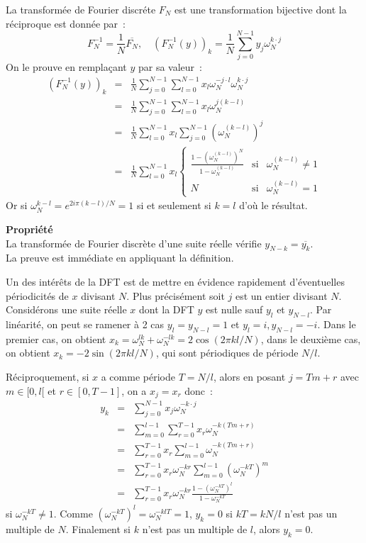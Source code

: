 \documentclass[a4paper,11pt]{article}
\begin{document}
La transform\'ee de Fourier discr\'ete  $F_N$ est une transformation 
bijective dont la réciproque est donnée par~:
\[ F_N^{-1}=\frac{1}{N} \overline{F_N}, \quad
{(F_N^{-1}(y))}_k=\frac{1}{N}\sum_{j=0}^{N-1}y_j\omega_N^{k\cdot j}
\]
On le prouve en remplaçant $y$ par sa valeur~:
\begin{eqnarray*}
{(F_N^{-1}(y))}_k &=&
\frac{1}{N}\sum_{j=0}^{N-1} \sum_{l=0}^{N-1} x_l \omega_N^{-j\cdot l}
\omega_N^{k\cdot j} \\
&=&
\frac{1}{N}\sum_{j=0}^{N-1} \sum_{l=0}^{N-1} x_l \omega_N^{j (k-l)} \\
&=& 
\frac{1}{N} \sum_{l=0}^{N-1} x_l \sum_{j=0}^{N-1} (\omega_N^{(k-l)})^j \\
&=&
\frac{1}{N} \sum_{l=0}^{N-1} x_l 
\left\{ \begin{array}{lcl}
\frac{1-(\omega_N^{(k-l)})^N}{1-\omega_N^{(k-l)}} & \mbox{si} &
\omega_N^{(k-l)}\neq 1 \\
N & \mbox{si} & \omega_N^{(k-l)} = 1 
\end{array} \right.
\end{eqnarray*}
Or si $\omega_N^{k-l}=e^{2i\pi(k-l)/N}=1$ si et seulement si $k=l$
d'où le résultat.

{\bf Propriété}\\
La transformée de Fourier discrète d'une suite réelle vérifie
$y_{N-k}=\overline{y_k}$.\\
La preuve est immédiate en appliquant la définition.

Un des intérêts de la DFT est de mettre en évidence rapidement
d'éventuelles périodicités de $x$ divisant $N$. Plus précisément
soit $j$ est un entier divisant $N$. Considérons une suite réelle $x$ dont
la DFT $y$ est nulle sauf $y_l$ et $y_{N-l}$. Par linéarité, on
peut se ramener à 2 cas $y_l=y_{N-l}=1$ et $y_l=i, y_{N-l}=-i$. Dans
le premier cas, on obtient $x_k=\omega_N^{lk}+\omega_N^{-lk}=2\cos(2\pi kl/N)$,
dans le deuxième cas, on obtient $x_k=-2\sin(2\pi kl/N)$, qui sont périodiques
de période $N/l$.

Réciproquement, si $x$ a comme période $T=N/l$, alors en posant
$j=T m + r$ avec $m\in[0,l[$ et $r\in[0,T-1]$, on a
$x_j=x_r$ donc~:
\begin{eqnarray*}
 y_k &=&\sum_{j=0}^{N-1} x_j \omega_N^{-k\cdot j} \\
&=&\sum_{m=0}^{l-1} \sum_{r=0}^{T-1} x_r \omega_N^{-k (T m+r)} \\
&=&\sum_{r=0}^{T-1} x_r \sum_{m=0}^{l-1} \omega_N^{-k (T m+r)} \\
&=& \sum_{r=0}^{T-1} x_r \omega_N^{-kr} \sum_{m=0}^{l-1}
(\omega_N^{-kT})^m \\
&=& \sum_{r=0}^{T-1} x_r \omega_N^{-kr} 
\frac{1-(\omega_N^{-kT})^l}{1-\omega_N^{-kT}}
\end{eqnarray*}
si $\omega_N^{-kT} \neq 1$. Comme $(\omega_N^{-kT})^l=\omega_N^{-klT}=1$,
$y_k=0$ si $kT=kN/l$ n'est pas un multiple de $N$. 
Finalement si $k$ n'est pas un multiple de $l$, alors $y_k=0$.
\end{document}
